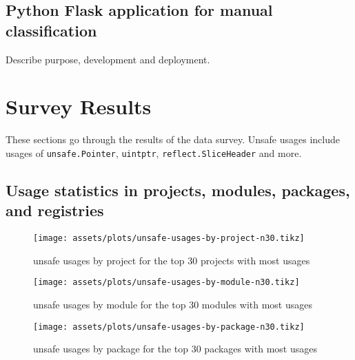 \subsection{Python Flask application for manual classification}\label{subsec:survey-classification}

Describe purpose, development and deployment.



\section{Survey Results}\label{sec:survey-results}

These sections go through the results of the data survey.
Unsafe usages include usages of \texttt{unsafe.Pointer}, \texttt{uintptr}, \texttt{reflect.SliceHeader} and more.



\subsection{Usage statistics in projects, modules, packages, and registries}\label{subsec:results-stats}

\begin{figure}[ht]
    \begin{center}
    {\scriptsize \texttt{[image: assets/plots/unsafe-usages-by-project-n30.tikz]}}
    \end{center}
    \caption{unsafe usages by project for the top 30 projects with most usages}
    \label{fig:unsafe-usages-by-project-n30}
\end{figure}

\begin{figure}[ht]
    \begin{center}
    {\scriptsize \texttt{[image: assets/plots/unsafe-usages-by-module-n30.tikz]}}
    \end{center}
    \caption{unsafe usages by module for the top 30 modules with most usages}
    \label{fig:unsafe-usages-by-module-n30}
\end{figure}

\begin{figure}[ht]
    \begin{center}
    {\scriptsize \texttt{[image: assets/plots/unsafe-usages-by-package-n30.tikz]}}
    \end{center}
    \caption{unsafe usages by package for the top 30 packages with most usages}
    \label{fig:unsafe-usages-by-package-n30}
\end{figure}


